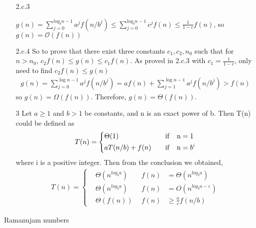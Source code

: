 \documentclass{assignment}
\begin{document}
\begin{homeworkProblem}
\begin{enumerate}
\item[2.c.3]

$g(n) = \sum_{j = 0}^{log_bn - 1} a^jf(n / b^j) \leq  \sum_{j = 0}^{log_bn - 1} c^jf(n)\leq \frac{1}{1-c} f(n)$, so $g(n) = \mathcal{O}(f(n))$

\item[2.c.4]
So to prove that there exist three constants $c_1, c_2, n_0$ such that for $n>n_0$, $c_2 f(n)\leq g(n) \leq c_1 f(n) $. As proved in 2.c.3 with $c_1 = \frac{1}{1-c}$, only need to find $c_2 f(n)\leq g(n)$
\begin{align*}
  g(n)=\sum_{j=0}^{\log n-1} a^{j} f\left(n / b^{j}\right) 
  = a f\left(n\right)+\sum_{j=1}^{\log n-1} a^{j} f\left(n / b^{j}\right) 
  > f(n)
\end{align*}
so $g(n) = \Omega(f(n))$. Therefore, $g(n) = \Theta(f(n))$.
\item[3] Let $a\geq 1$ and $b > 1$ be constants, and n is an exact power of b. Then T(n) could be defined as 
\begin{align*}
	T(n) = \left\{
	\begin{aligned}
	&\Theta(1) \ \ \ & \rm{if } \quad n &= 1 \\
	& a T(n / b)+f(n)\ \ \  & \rm{if } \quad n &= b^i
	\end{aligned}
	\right.
\end{align*}
where i is a positive integer. Then from the conclusion we obtained,
\begin{align*}
	T(n) = \left\{
	\begin{aligned}
	&\Theta(n^{log_ba}) \ \ & f(n) &= \Theta(n^{log_ba})\\
	& \Theta(n^{log_ba})\ \ \  & f(n) &= O(n^{log_ba- \varepsilon}) \\
	& \Theta(f(n))\ \  & f(n) &\geq  \frac{a}{c}f(n/b)
	\end{aligned}
	\right.
\end{align*}

    \end{enumerate}
    \end{homeworkProblem}
    
    \begin{homeworkProblem}
    
     \begin{algorithm}[H]
 \BlankLine
{}
\caption{Ramanujam numbers} 
\end{algorithm}
    \end{homeworkProblem}
    
\end{document}
